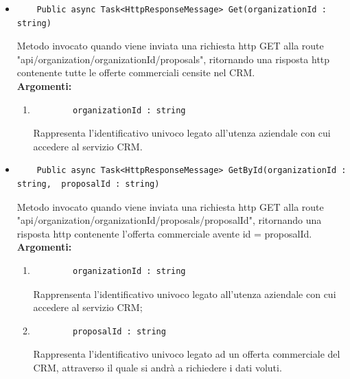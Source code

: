 \begin{itemize}
	\itemsep0em 
	\item 
	\begin{lstlisting}
	Public async Task<HttpResponseMessage> Get(organizationId : string)
	\end{lstlisting}
	Metodo invocato quando viene inviata una richiesta \gls{http} GET alla route "api/organization/{organizationId}/proposals", ritornando una risposta \gls{http} contenente tutte le offerte commerciali censite nel CRM.\\
	\textbf{\small Argomenti:}
	\begin{enumerate}[leftmargin=*]
		\itemsep0em 
		\item \begin{lstlisting}
		organizationId : string 
		\end{lstlisting}
		Rappresenta l'identificativo univoco legato all'utenza aziendale con cui accedere al servizio CRM.
	\end{enumerate}
	
	\item 
	\begin{lstlisting}
	Public async Task<HttpResponseMessage> GetById(organizationId : string,  proposalId : string)
	\end{lstlisting}
	Metodo invocato quando viene inviata una richiesta \gls{http} GET alla route "api/organization/{organizationId}/proposals/{proposalId}", ritornando una risposta \gls{http} contenente l'offerta commerciale avente id = {proposalId}.\\
	\textbf{\small Argomenti:}
	\begin{enumerate}[leftmargin=*]
		\itemsep0em 
		\item 
		\begin{lstlisting}
		organizationId : string 
		\end{lstlisting}
		Rapprensenta l'identificativo univoco legato all'utenza aziendale con cui accedere al servizio CRM;
		\item 
		\begin{lstlisting}
		proposalId : string
		\end{lstlisting}
		Rappresenta l'identificativo univoco legato ad un offerta commerciale del CRM, attraverso il quale si andrà a richiedere i dati voluti.
	\end{enumerate}


\end{itemize}

